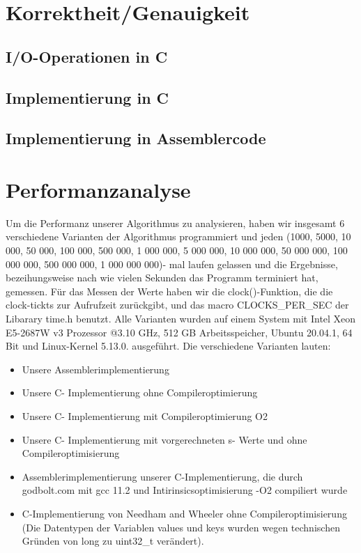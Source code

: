 \documentclass[course=asp]{aspdoc}
\begin{document}
\section{Korrektheit/Genauigkeit}
\subsection*{I/O-Operationen in C}
\subsection*{Implementierung in C}
\subsection*{Implementierung in Assemblercode}
\newpage

\section{Performanzanalyse}
Um die Performanz unserer Algorithmus zu analysieren, haben wir insgesamt 6 verschiedene Varianten der Algorithmus programmiert und jeden (1000, 5000, 10 000, 50 000, 100 000, 500 000, 1 000 000, 5 000 000, 10 000 000, 50 000 000, 100 000 000, 500 000 000, 1 000 000 000)- mal laufen gelassen und die Ergebnisse, bezeihungsweise nach wie vielen Sekunden das Programm terminiert hat, gemessen. Für das Messen der Werte haben wir die clock()-Funktion, die die clock-tickts zur Aufrufzeit zurückgibt, und das macro CLOCKS\_PER\_SEC der Libarary time.h benutzt. Alle Varianten wurden auf einem System mit Intel Xeon E5-2687W v3 Prozessor @3.10 GHz, 512 GB Arbeitsspeicher, Ubuntu 20.04.1, 64 Bit und Linux-Kernel 5.13.0. ausgeführt. Die verschiedene Varianten lauten:
\begin{itemize}
\item Unsere Assemblerimplementierung
\item Unsere C- Implementierung ohne Compileroptimierung
\item Unsere C- Implementierung mit Compileroptimierung O2
\item Unsere C- Implementierung mit vorgerechneten s- Werte und ohne Compileroptimisierung
\item Assemblerimplementierung unserer C-Implementierung, die durch godbolt.com mit gcc 11.2 und Intirinsicsoptimisierung -O2 compiliert wurde
\item C-Implementierung von Needham and Wheeler ohne Compileroptimisierung (Die Datentypen der Variablen values und keys wurden wegen technischen Gründen von long zu uint32\_t verändert).
\end{itemize}
\end{document}

